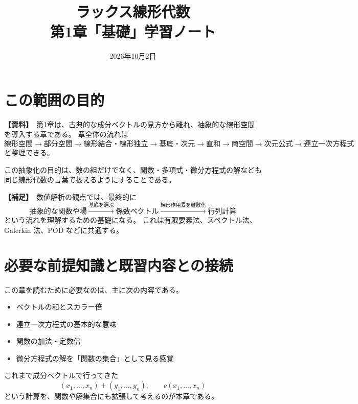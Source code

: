 \documentclass[a4paper,11pt]{ltjsarticle}
\title{\vspace{-1.5em}ラックス線形代数\\第1章「基礎」学習ノート}
\author{}
\date{2026年10月2日}
\newcommand{\sourceitem}{\textbf{【資料】}}
\newcommand{\suppitem}{\textbf{【補足】}}
\begin{document}
\maketitle
\vspace{-2em}

\begin{center}
\end{center}

\section{この範囲の目的}

\sourceitem\ 第1章は、古典的な成分ベクトルの見方から離れ、抽象的な線形空間を導入する章である。
章全体の流れは
\[
\boxed{
\text{線形空間}
\to \text{部分空間}
\to \text{線形結合・線形独立}
\to \text{基底・次元}
\to \text{直和}
\to \text{商空間}
\to \text{次元公式}
\to \text{連立一次方程式}
}
\]
と整理できる。

この抽象化の目的は、数の組だけでなく、関数・多項式・微分方程式の解なども同じ線形代数の言葉で扱えるようにすることである。

\suppitem\ 数値解析の観点では、最終的に
\[
\boxed{
\text{抽象的な関数や場}
\xrightarrow{\text{基底を選ぶ}}
\text{係数ベクトル}
\xrightarrow{\text{線形作用素を離散化}}
\text{行列計算}
}
\]
という流れを理解するための基礎になる。
これは有限要素法、スペクトル法、Galerkin 法、POD などに共通する。

\section{必要な前提知識と既習内容との接続}

この章を読むために必要なのは、主に次の内容である。
\begin{itemize}
  \item ベクトルの和とスカラー倍
  \item 連立一次方程式の基本的な意味
  \item 関数の加法・定数倍
  \item 微分方程式の解を「関数の集合」として見る感覚
\end{itemize}

これまで成分ベクトルで行ってきた
\[
(x_1,\dots,x_n)+(y_1,\dots,y_n),\qquad
c(x_1,\dots,x_n)
\]
という計算を、関数や解集合にも拡張して考えるのが本章である。
\end{document}
